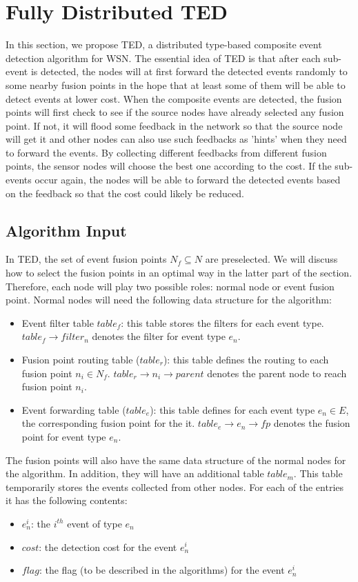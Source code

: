 \section{Fully Distributed TED}
\label{sec:cedu}
In this section, we propose TED, a distributed type-based composite event detection algorithm for WSN. The essential idea of TED is that after each sub-event is detected, the nodes will at first forward the detected events randomly to some nearby fusion points in the hope that at least some of them will be able to detect events at lower cost. When the composite events are detected, the fusion points will first check to see if the source nodes have already selected any fusion point. If not, it will flood some feedback in the network so that the source node will get it and other nodes can also use such feedbacks as 'hints' when they need to forward the events. By collecting different feedbacks from different fusion points, the sensor nodes will choose the best one according to the cost. If the sub-events occur again, the nodes will be able to forward the detected events based on the feedback so that the cost could likely be reduced.

\subsection{Algorithm Input}
In TED, the set of event fusion points \(N_f\subseteq N\) are preselected. We will discuss how to select the fusion points in an optimal way in the latter part of the section. Therefore, each node will play two possible roles: normal node or event fusion point. Normal nodes will need the following data structure for the algorithm:
\begin{itemize}
\item Event filter table \(table_f\): this table stores the filters for each event type. \(table_f\rightarrow filter_n\) denotes the filter for event type \(e_n\).
\item Fusion point routing table (\(table_r\)): this table defines the routing to each fusion point \(n_i\in N_f\). \(table_r\rightarrow n_i\rightarrow parent\) denotes the parent node to reach fusion point \(n_i\).
\item Event forwarding table (\(table_e\)): this table defines for each event type \(e_n\in E\), the corresponding fusion point for the it. \(table_e\rightarrow e_n\rightarrow fp\) denotes the fusion point for event type \(e_n\).
\end{itemize}

The fusion points will also have the same data structure of the normal nodes for the algorithm. In addition, they will have an additional table \(table_m\). This table temporarily stores the events collected from other nodes. For each of the entries it has the following contents: 
\begin{itemize}
\item \(e^i_n\): the \(i^{th}\) event of type \(e_n\)
\item \(cost\): the detection cost for the event \(e^i_n\)
\item \(flag\): the flag (to be described in the algorithms) for the event \(e^i_n\)
\end{itemize}

